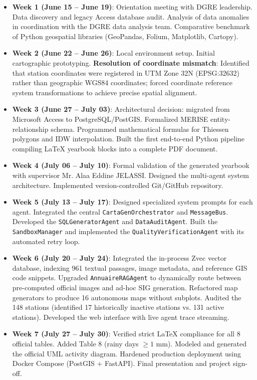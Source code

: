 \documentclass[12pt,a4paper]{report}
\begin{document}
\begin{itemize}
  \item \textbf{Week 1 (June 15 -- June 19)}: Orientation meeting with DGRE leadership. Data discovery and legacy Access database audit. Analysis of data anomalies in coordination with the DGRE data analysis team. Comparative benchmark of Python geospatial libraries (GeoPandas, Folium, Matplotlib, Cartopy).
  \item \textbf{Week 2 (June 22 -- June 26)}: Local environment setup. Initial cartographic prototyping. \textbf{Resolution of coordinate mismatch}: Identified that station coordinates were registered in UTM Zone 32N (EPSG:32632) rather than geographic WGS84 coordinates; forced coordinate reference system transformations to achieve precise spatial alignment.
  \item \textbf{Week 3 (June 27 -- July 03)}: Architectural decision: migrated from Microsoft Access to PostgreSQL/PostGIS. Formalized MERISE entity-relationship schema. Programmed mathematical formulas for Thiessen polygons and IDW interpolation. Built the first end-to-end Python pipeline compiling LaTeX yearbook blocks into a complete PDF document.
  \item \textbf{Week 4 (July 06 -- July 10)}: Formal validation of the generated yearbook with supervisor Mr. Alaa Eddine JELASSI. Designed the multi-agent system architecture. Implemented version-controlled Git/GitHub repository.
  \item \textbf{Week 5 (July 13 -- July 17)}: Designed specialized system prompts for each agent. Integrated the central \texttt{CartaGenOrchestrator} and \texttt{MessageBus}. Developed the \texttt{SQLGeneratorAgent} and \texttt{DataAuditAgent}. Built the \texttt{SandboxManager} and implemented the \texttt{QualityVerificationAgent} with its automated retry loop.
  \item \textbf{Week 6 (July 20 -- July 24)}: Integrated the in-process Zvec vector database, indexing 961 textual passages, image metadata, and reference GIS code snippets. Upgraded \texttt{AnnuaireRAGAgent} to dynamically route between pre-computed official images and ad-hoc SIG generation. Refactored map generators to produce 16 autonomous maps without subplots. Audited the 148 stations (identified 17 historically inactive stations vs. 131 active stations). Developed the web interface with live agent trace streaming.
  \item \textbf{Week 7 (July 27 -- July 30)}: Verified strict LaTeX compliance for all 8 official tables. Added Table 8 (rainy days $\geq 1\text{ mm}$). Modeled and generated the official UML activity diagram. Hardened production deployment using Docker Compose (PostGIS + FastAPI). Final presentation and project sign-off.
\end{itemize}
\end{document}
